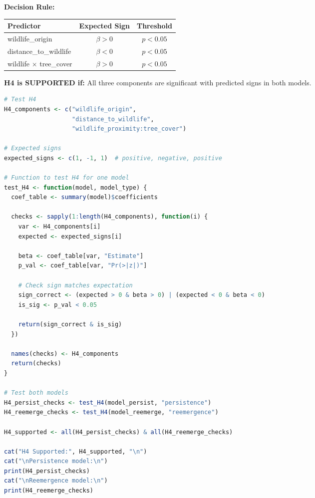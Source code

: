 \documentclass[11pt,a4paper]{article}
\begin{document}
\textbf{Decision Rule:}

\begin{table}[h]
\centering
\small
\begin{tabular}{@{}lcc@{}}
\toprule
\textbf{Predictor} & \textbf{Expected Sign} & \textbf{Threshold} \\
\midrule
wildlife\_origin & $\beta > 0$ & $p < 0.05$ \\
distance\_to\_wildlife & $\beta < 0$ & $p < 0.05$ \\
wildlife $\times$ tree\_cover & $\beta > 0$ & $p < 0.05$ \\
\bottomrule
\end{tabular}
\end{table}

\textbf{H4 is SUPPORTED if:} All three components are significant with predicted signs in both models.

\begin{rcode}
\begin{lstlisting}[language=R]
# Test H4
H4_components <- c("wildlife_origin", 
                   "distance_to_wildlife", 
                   "wildlife_proximity:tree_cover")

# Expected signs
expected_signs <- c(1, -1, 1)  # positive, negative, positive

# Function to test H4 for one model
test_H4 <- function(model, model_type) {
  coef_table <- summary(model)$coefficients
  
  checks <- sapply(1:length(H4_components), function(i) {
    var <- H4_components[i]
    expected <- expected_signs[i]
    
    beta <- coef_table[var, "Estimate"]
    p_val <- coef_table[var, "Pr(>|z|)"]
    
    # Check sign matches expectation
    sign_correct <- (expected > 0 & beta > 0) | (expected < 0 & beta < 0)
    is_sig <- p_val < 0.05
    
    return(sign_correct & is_sig)
  })
  
  names(checks) <- H4_components
  return(checks)
}

# Test both models
H4_persist_checks <- test_H4(model_persist, "persistence")
H4_reemerge_checks <- test_H4(model_reemerge, "reemergence")

H4_supported <- all(H4_persist_checks) & all(H4_reemerge_checks)

cat("H4 Supported:", H4_supported, "\n")
cat("\nPersistence model:\n")
print(H4_persist_checks)
cat("\nReemergence model:\n")
print(H4_reemerge_checks)
\end{lstlisting}
\end{rcode}
\end{document}
